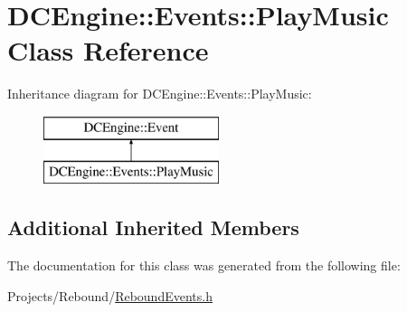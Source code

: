 \hypertarget{classDCEngine_1_1Events_1_1PlayMusic}{\section{D\-C\-Engine\-:\-:Events\-:\-:Play\-Music Class Reference}
\label{classDCEngine_1_1Events_1_1PlayMusic}
}
Inheritance diagram for D\-C\-Engine\-:\-:Events\-:\-:Play\-Music\-:\begin{figure}[H]
\begin{center}
\leavevmode
\includegraphics[height=2.000000cm]{classDCEngine_1_1Events_1_1PlayMusic}
\end{center}
\end{figure}
\subsection*{Additional Inherited Members}


The documentation for this class was generated from the following file\-:\begin{DoxyCompactItemize}
\item 
Projects/\-Rebound/\hyperlink{ReboundEvents_8h}{Rebound\-Events.\-h}\end{DoxyCompactItemize}
